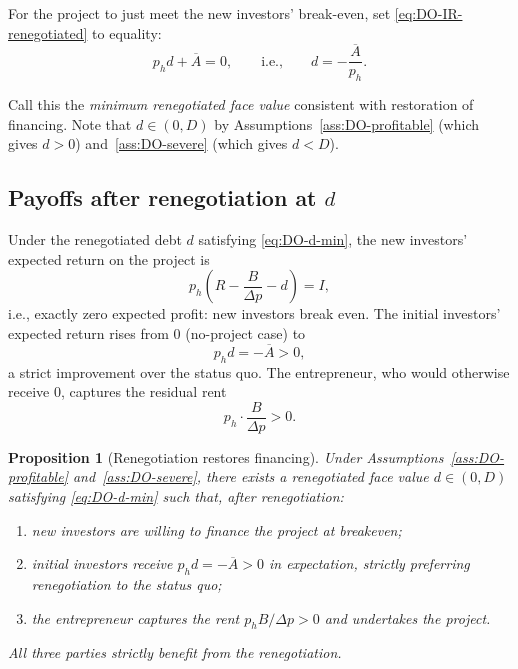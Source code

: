\documentclass[11pt,a4paper,oneside]{book}
\theoremstyle{plain}
\newtheorem{proposition}[theorem]{Proposition}
\theoremstyle{definition}
\theoremstyle{remark}
\numberwithin{equation}{chapter}
\begin{document}
For the project to just meet the new investors' break-even, set \eqref{eq:DO-IR-renegotiated} to equality:
\begin{equation}\label{eq:DO-d-min}
  p_h d + \overline{A} = 0,
  \qquad \text{i.e.,} \qquad
  d = -\frac{\overline{A}}{p_h}.
\end{equation}

Call this the \emph{minimum renegotiated face value} consistent with restoration of financing.
Note that $d \in (0, D)$ by Assumptions~\ref{ass:DO-profitable} (which gives $d > 0$) and~\ref{ass:DO-severe} (which gives $d < D$).

\subsection{Payoffs after renegotiation at \texorpdfstring{$d$}{d}}

Under the renegotiated debt $d$ satisfying \eqref{eq:DO-d-min}, the new investors' expected return on the project is
\begin{equation}\label{eq:DO-new-zero}
  p_h \left( R - \frac{B}{\Delta p} - d \right) = I,
\end{equation}
i.e., exactly zero expected profit: new investors break even.
The initial investors' expected return rises from $0$ (no-project case) to
\begin{equation}\label{eq:DO-initial-gain}
  p_h d = -\overline{A} > 0,
\end{equation}
a strict improvement over the status quo.
The entrepreneur, who would otherwise receive $0$, captures the residual rent
\begin{equation}\label{eq:DO-entrepreneur-rent}
  p_h \cdot \frac{B}{\Delta p} > 0.
\end{equation}

\begin{proposition}[Renegotiation restores financing]\label{prop:DO-renegotiation}
Under Assumptions~\ref{ass:DO-profitable} and~\ref{ass:DO-severe}, there exists a renegotiated face value $d \in (0, D)$ satisfying \eqref{eq:DO-d-min} such that, after renegotiation:
\begin{enumerate}
  \item[\textup{(i)}] new investors are willing to finance the project at breakeven;
  \item[\textup{(ii)}] initial investors receive $p_h d = -\overline{A} > 0$ in expectation, strictly preferring renegotiation to the status quo;
  \item[\textup{(iii)}] the entrepreneur captures the rent $p_h B / \Delta p > 0$ and undertakes the project.
\end{enumerate}
All three parties strictly benefit from the renegotiation.
\end{proposition}
\end{document}

